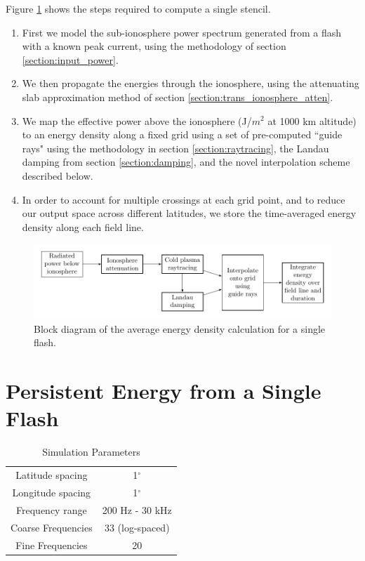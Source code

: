 Figure \ref{fig:power_blockdiagram} shows the steps required to compute a single stencil. 
\begin{enumerate}
\item{First we model the sub-ionosphere power spectrum generated from a flash with a known peak current, using the methodology of section \ref{section:input_power}.}
\item{We then propagate the energies through the ionosphere, using the attenuating slab approximation method of section \ref{section:trans_ionosphere_atten}.}
\item{We map the effective power above the ionosphere (J/$m^2$ at 1000 km altitude) to an energy density along a fixed grid using a set of pre-computed ``guide rays" using the methodology in section \ref{section:raytracing}, the Landau damping from section \ref{section:damping}, and the novel interpolation scheme described below.}
\item{In order to account for multiple crossings at each grid point, and to reduce our output space across different latitudes, we store the time-averaged energy density along each field line.}
 \end{enumerate}
\begin{figure}
\begin{center}
\includegraphics[width=\textwidth]{figures/lightning_power_block_diagram.pdf}
\caption[Energy density calculation block diagram]{Block diagram of the average energy density calculation for a single flash.}
\label{fig:power_blockdiagram}
\end{center}
\end{figure}

\section{Persistent Energy from a Single Flash}

\begin{table}
\caption{Simulation Parameters}
\begin{center}
\begin{tabular}{c|c}
Latitude spacing & 1$^\circ$ \\
Longitude spacing & 1$^\circ$ \\
Frequency range & 200 Hz - 30 kHz \\
Coarse Frequencies & 33 (log-spaced) \\
Fine Frequencies & 20 \\
\end{tabular}
\end{center}
\label{default}
\end{table}%

